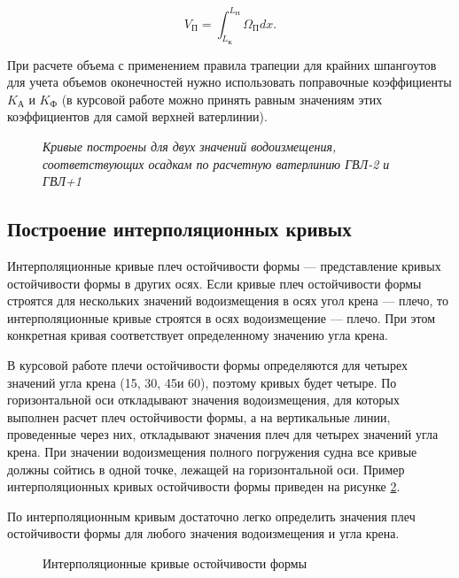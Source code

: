 \begin{equation}
    V_{\text{П}} = \int_{L_{\text{К}}}^{L_{\text{Н}}} \Omega_{\text{П}} dx.
\end{equation}

При расчете объема с применением правила трапеции для крайних шпангоутов для учета объемов оконечностей нужно использовать поправочные коэффициенты $K_{\text{А}}$ и $K_{\text{Ф}}$ (в курсовой работе можно принять равным значениям этих коэффициентов для самой верхней ватерлинии).

\begin{figure}[h!]
    \centerline{}
    \caption{Зависимость плеча остойчивости формы от угла крена для различных водоизмещений}
    \caption*{\textit{Кривые построены для двух значений водоизмещения, соответствующих осадкам по расчетную ватерлинию ГВЛ-2 и ГВЛ+1}}
    \label{fig:form-stability-arm}
\end{figure}

\subsection{Построение интерполяционных кривых}

Интерполяционные кривые плеч остойчивости формы --- представление кривых остойчивости формы в других осях.
Если кривые плеч остойчивости формы строятся для нескольких значений водоизмещения в осях угол крена --- плечо, то интерполяционные кривые строятся в осях водоизмещение --- плечо.
При этом конкретная кривая соответствует определенному значению угла крена.

В курсовой работе плечи остойчивости формы определяются для четырех значений угла крена (15\textdegree, 30\textdegree, 45\textdegree и 60\textdegree), поэтому кривых будет четыре.
По горизонтальной оси откладывают значения водоизмещения, для которых выполнен расчет плеч остойчивости формы, а на вертикальные линии, проведенные через них, откладывают значения плеч для четырех значений угла крена.
При значении водоизмещения полного погружения судна все кривые должны сойтись в одной точке, лежащей на горизонтальной оси.
Пример интерполяционных кривых остойчивости формы приведен на рисунке \ref{fig:interpolation-curves-stability}.

По интерполяционным кривым достаточно легко определить значения плеч остойчивости формы для любого значения водоизмещения и угла крена.

\begin{figure}[h!]
    \centerline{}
    \caption{Интерполяционные кривые остойчивости формы}
    \label{fig:interpolation-curves-stability}
\end{figure}

